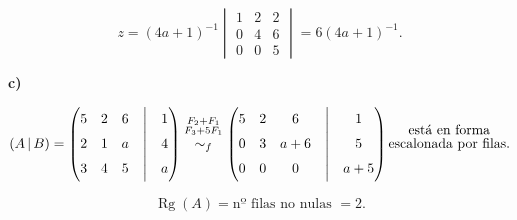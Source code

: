 \documentclass[a4paper,12pt]{article}
\begin{document}
\begin{ejercicio}[title=Ejercicio 30]
\begin{itemize}
\[
z=(4a+1)^{-1}
\begin{vmatrix}
1 & 2 & 2\\
0 & 4 & 6\\
0 & 0 & 5
\end{vmatrix}
=\boxed{6(4a+1)^{-1}}.
\]
\end{itemize}

\vspace{1em}

\textbf{c)}

\[
(A\,|\,B)=
\begin{pmatrix}
5 & 2 & 6 &\Big|& 1\\
2 & 1 & a &\Big|& 4\\
3 & 4 & 5 &\Big|& a
\end{pmatrix}
\overset{\substack{F_2+F_1\\F_3+5F_1\\{}}}{\sim_f}
\begin{pmatrix}
5 & 2 & 6 &\Big|& 1\\
0 & 3 & a+6 &\Big|& 5\\
0 & 0 & 0 &\Big|& a+5
\end{pmatrix}
\text{\shortstack{ está en forma\\ escalonada por filas.}}
\]

\[
\operatorname{Rg}(A)=\text{nº filas no nulas }=2.
\]
\end{ejercicio}
\end{document}
